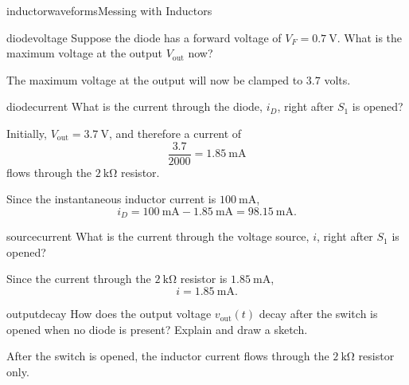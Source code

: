 \begin{mainquestion}{inductorwaveforms}{Messing with Inductors}
\begin{partquestion}{diodevoltage}
{Suppose the diode has a forward voltage of $V_F=\SI{0.7}{\volt}$. What is the maximum voltage at the output $V_\mathrm{out}$ now?}

\begin{answer}[1in]
    The maximum voltage at the output will now be clamped to $3.7$ volts.
\end{answer}

\end{partquestion}

\begin{partquestion}{diodecurrent}
{What is the current through the diode, $i_D$, right after $S_1$ is opened?}

\begin{answer}[1in]
    Initially, $V_\mathrm{out}=\SI{3.7}{\volt}$, and therefore a current of
    \[
    \frac{3.7}{2000} = \SI{1.85}{\milli\ampere}
    \]
    flows through the $\SI{2}{\kilo\ohm}$ resistor.
    
    Since the instantaneous inductor current is $\SI{100}{\milli\ampere}$,
    \[
    i_D = \SI{100}{\milli\ampere} - \SI{1.85}{\milli\ampere}
    = \boxed{\SI{98.15}{\milli\ampere}}.
    \]
\end{answer}

\end{partquestion}

\begin{partquestion}{sourcecurrent}
{What is the current through the voltage source, $i$, right after $S_1$ is opened?}

\begin{answer}[1in]
    Since the current through the $\SI{2}{\kilo\ohm}$ resistor is $\SI{1.85}{\milli\ampere}$,
    \[
    i = \boxed{\SI{1.85}{\milli\ampere}}.
    \]
\end{answer}

\end{partquestion}

\begin{partquestion}{outputdecay}
{How does the output voltage $v_\mathrm{out}(t)$ decay after the switch is opened
    when no diode is present? Explain and draw a sketch.}

\begin{answer}[3in]
    After the switch is opened, the inductor current flows through the
    $\SI{2}{\kilo\ohm}$ resistor only.
    

\end{answer}
\end{partquestion}
\end{mainquestion}
